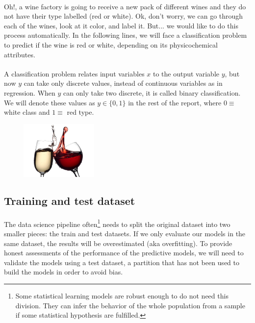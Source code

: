 \documentclass[10pt]{article}
\begin{document}
\paragraph*{}
Oh!, a wine factory is going to receive a new pack of different wines and they do not have their type labelled (red or white). Ok, don't worry, we can go through each of the wines, look at it color, and label it. But... we would like to do this process automatically.  In the following lines, we will face a classification problem to predict if the wine is red or white, depending on its physicochemical attributes. 

\paragraph*{}
A classification problem relates input variables $x$ to the output variable $y$, but now $y$ can take only discrete values, instead of continuous variables as in regression. When $y$ can only take two discrete, it is called binary classification. We will denote these values as $y \in \{0, 1\}$ in the rest of the report, where $0 \equiv$ white class and $1 \equiv$ red type.

\begin{figure}[H]
	\centering
	\includegraphics[width=1.5in]{figures/wines.jpg} 
\end{figure}


\subsection{Training and test dataset}

\paragraph*{}
The data science pipeline often\footnote{Some statistical learning models are robust enough to do not need this division. They can infer the behavior of the whole population from a sample if some statistical hypothesis are fulfilled.} needs to split the original dataset into two smaller pieces: the train and test datasets. If we only evaluate our models in the same dataset, the results will be overestimated (aka overfitting). To provide honest assessments of the performance of the predictive models, we will need to validate the models using a test dataset, a partition that has not been used to build the models in order to avoid bias. 
\end{document}
